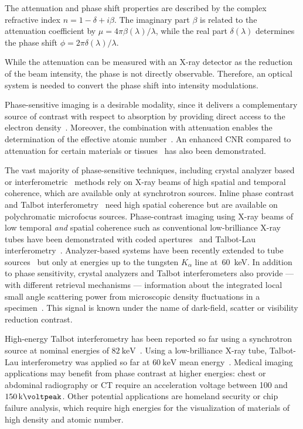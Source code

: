 \documentclass[english]{nature}
\begin{document}
The attenuation and phase shift properties are described by the complex
refractive index $n=1 - \delta + i \beta$. The imaginary part $\beta$ is
related to the attenuation coefficient by $\mu = 4 \pi \beta(\lambda) /
\lambda$, while the real part $\delta(\lambda)$ determines the phase shift
$\phi = 2 \pi \delta(\lambda) / \lambda$.

While the attenuation can be measured with an X-ray detector as the
reduction of the beam intensity, the phase is not directly observable.
Therefore, an optical system is needed to convert the phase shift into
intensity modulations.

Phase-sensitive imaging is a desirable modality, since it delivers a
complementary source of contrast with respect to absorption by providing
direct access to the electron density~\cite{Als-Nielsen2011}. Moreover, the
combination with attenuation enables the determination of the effective
atomic number~\cite{Qi2010}. An enhanced \ac{CNR} compared to
attenuation for certain materials or
tissues~\cite{Pfeiffer2007a,McDonald2009} has also been demonstrated.

The vast majority of phase-sensitive techniques, including crystal analyzer
based~\cite{Davis1995,Chapman1997} or
interferometric~\cite{Bonse1965,Momose1996} methods rely on X-ray beams of
high spatial and temporal coherence, which are available only at synchrotron
sources. Inline phase contrast~\cite{Snigirev1995,Wilkins1996,Cloetens1996}
and Talbot interferometry~\cite{Cloetens1997,David2002,Momose2003a} need
high spatial coherence but are available on polychromatic microfocus
sources. Phase-contrast imaging using X-ray beams of low temporal \emph{and}
spatial coherence such as conventional low-brilliance X-ray tubes have been
demonstrated with coded apertures~\cite{Munro2012} and Talbot-Lau
interferometry~\cite{Pfeiffer2006}. Analyzer-based systems have been
recently extended to tube sources~\cite{Nesch2009,Parham2009} but only at
energies up to the tungsten $K_\alpha$ line at~\SI{60}{\kilo\eV}. In
addition to phase sensitivity, crystal analyzers and Talbot interferometers
also provide --- with different retrieval mechanisms --- information
about the integrated local small angle scattering power from microscopic
density fluctuations in a specimen~\cite{Pfeiffer2008}. This signal is known
under the name of dark-field, scatter or visibility reduction contrast.

High-energy Talbot interferometry has been reported so far using a
synchrotron source at nominal energies of
$\SI{82}{\kilo\electronvolt}$~\cite{Willner2013}. Using a low-brilliance
X-ray tube, Talbot-Lau interferometry was applied so far at
$\SI{60}{\kilo\electronvolt}$ mean energy~\cite{Donath2009a}. Medical imaging
applications may benefit from phase contrast at higher energies: chest or
abdominal radiography or \ac{CT} require an acceleration voltage between
\num{100} and $\SI{150}{\kilo\voltpeak}$. Other potential applications are
homeland security or chip failure analysis, which require high energies for
the visualization of materials of high density and atomic number.
\end{document}
